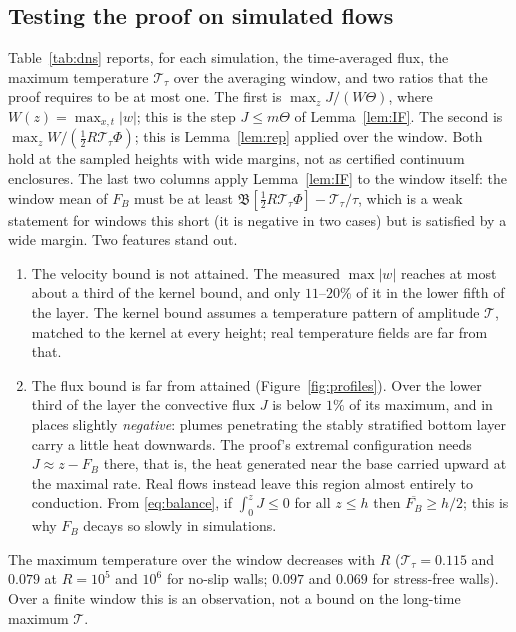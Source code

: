 \subsection{Testing the proof on simulated flows}\label{sec:tests}
Table~\ref{tab:dns} reports, for each simulation, the time-averaged flux, the maximum temperature
$\mathcal T_\tau$ over the averaging window, and two ratios that the proof requires to be at most one. The first is
$\max_zJ/(W\Theta)$, where $W(z)=\max_{x,t}|w|$; this is the step $J\le m\Theta$ of Lemma~\ref{lem:IF}. The
second is $\max_zW/(\frac12R\mathcal T_\tau\Phi)$; this is Lemma~\ref{lem:rep} applied over the window. Both hold
at the sampled heights with wide margins, not as certified continuum enclosures. The last two columns apply Lemma~\ref{lem:IF} to the window itself: the window
mean of $F_B$ must be at least $\mathfrak B[\frac12R\mathcal T_\tau\Phi]-\mathcal T_\tau/\tau$, which is a weak
statement for windows this short (it is negative in two cases) but is satisfied by a wide margin. Two features
stand out.
\begin{enumerate}
\item The velocity bound is not attained. The measured $\max|w|$ reaches at most about a third of the kernel
bound, and only $11$--$20\%$ of it in the lower fifth of the layer. The kernel bound assumes a temperature
pattern of amplitude $\mathcal T$, matched to the kernel at every height; real temperature fields are far from
that.
\item The flux bound is far from attained (Figure~\ref{fig:profiles}). Over the lower third of the layer
the convective flux $J$ is below $1\%$ of its maximum, and in places slightly \emph{negative}: plumes penetrating
the stably stratified bottom layer carry a little heat downwards. The proof's extremal configuration needs
$J\approx z-F_B$ there, that is, the heat generated near the base carried upward at the maximal rate. Real flows
instead leave this region almost entirely to conduction. From \eqref{eq:balance}, if
$\int_0^zJ\le0$ for all $z\le h$ then $\overline{F_B}\ge h/2$; this is why $F_B$ decays so slowly in
simulations.
\end{enumerate}
The maximum temperature over the window decreases with $R$ ($\mathcal T_\tau=0.115$ and $0.079$ at $R=10^5$ and
$10^6$ for no-slip walls; $0.097$ and $0.069$ for stress-free walls). Over a finite window this is an observation,
not a bound on the long-time maximum $\mathcal T$.

